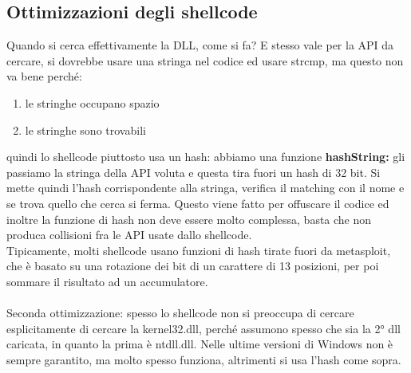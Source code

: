 \documentclass[12pt, oneside]{extbook}
\begin{document}
\subsection{Ottimizzazioni degli shellcode}
Quando si cerca effettivamente la DLL, come si fa? E stesso vale per la API da cercare, si dovrebbe usare una stringa nel codice ed usare strcmp, ma questo non va bene perché:
\begin{enumerate}
	\item le stringhe occupano spazio
	\item le stringhe sono trovabili
\end{enumerate}
quindi lo shellcode piuttosto usa un hash: abbiamo una funzione \textbf{hashString:} gli passiamo la stringa della API voluta e questa tira fuori un hash di 32 bit. Si mette quindi l'hash corrispondente alla stringa, verifica il matching con il nome e se trova quello che cerca si ferma. Questo viene fatto per offuscare il codice ed inoltre la funzione di hash non deve essere molto complessa, basta che non produca collisioni fra le API usate dallo shellcode.\\Tipicamente, molti shellcode usano funzioni di hash tirate fuori da metasploit, che è basato su una rotazione dei bit di un carattere di 13 posizioni, per poi sommare il risultato ad un accumulatore.\\\\Seconda ottimizzazione: spesso lo shellcode non si preoccupa di cercare esplicitamente di cercare la kernel32.dll, perché assumono spesso che sia la 2° dll caricata, in quanto la prima è ntdll.dll. Nelle ultime versioni di Windows non è sempre garantito, ma molto spesso funziona, altrimenti si usa l'hash come sopra.
\end{document}
